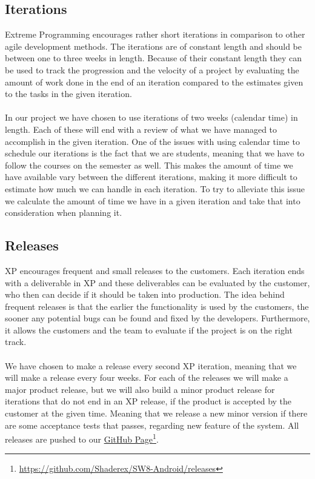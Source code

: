 \subsection{Iterations}
\label{sub:iterations}
Extreme Programming encourages rather short iterations in comparison to other agile development methods. The iterations are of constant length and should be between one to three weeks in length. Because of their constant length they can be used to track the progression and the velocity of a project by evaluating the amount of work done in the end of an iteration compared to the estimates given to the tasks in the given iteration. 
\\\\
In our project we have chosen to use iterations of two weeks (calendar time) in length. Each of these will end with a review of what we have managed to accomplish in the given iteration. One of the issues with using calendar time to schedule our iterations is the fact that we are students, meaning that we have to follow the courses on the semester as well. This makes the amount of time we have available vary between the different iterations, making it more difficult to estimate how much we can handle in each iteration. To try to alleviate this issue we calculate the amount of time we have in a given iteration and take that into consideration when planning it. 

\subsection{Releases}
XP encourages frequent and small releases to the customers. Each iteration ends with a deliverable in XP and these deliverables can be evaluated by the customer, who then can decide if it should be taken into production. The idea behind frequent releases is that the earlier the functionality is used by the customers, the sooner any potential bugs can be found and fixed by the developers. Furthermore, it allows the customers and the team to evaluate if the project is on the right track.
\\\\
We have chosen to make a release every second XP iteration, meaning that we will make a release every four weeks. For each of the releases we will make a major product release, but we will also build a minor product release for iterations that do not end in an XP release, if the product is accepted by the customer at the given time. Meaning that we release a new minor version if there are some acceptance tests that passes, regarding new feature of the system. All releases are pushed to our \href{https://github.com/Shaderex/SW8-Android/releases}{GitHub Page}\footnote{\url{https://github.com/Shaderex/SW8-Android/releases}}.

